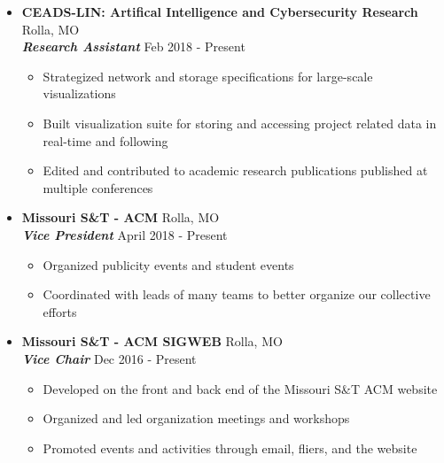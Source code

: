 \documentclass[9pt,oneside]{memoir}
\begin{document}
\begin{itemize}
    \item[] \textbf{CEADS-LIN: Artifical Intelligence and Cybersecurity Research}
		\hfill Rolla, MO\\
		\textit{\textbf{Research Assistant}}
		\hfill Feb 2018 - Present
		\begin{itemize}
		    \item[\textbullet] Strategized network and storage specifications for large-scale visualizations
		    \item[\textbullet] Built visualization suite for storing and accessing project related data in real-time and following
			\item[\textbullet] Edited and contributed to academic research publications published at multiple conferences
		\end{itemize}
		
	\item[] \textbf{Missouri S\&T - ACM}
	    \hfill Rolla, MO\\
	    \textit{\textbf{Vice President}}
	    \hfill April 2018 - Present
	    \begin{itemize}
	        \item[\textbullet] Organized publicity events and student events
	        \item[\textbullet] Coordinated with leads of many teams to better organize our collective efforts
	    \end{itemize}
		
	\item[] \textbf{Missouri S\&T - ACM SIGWEB}
		\hfill Rolla, MO\\
		\textit{\textbf{Vice Chair}}
		\hfill Dec 2016 - Present
		\begin{itemize}
			\item[\textbullet] Developed on the front and back end of the Missouri S\&T ACM website
			\item[\textbullet] Organized and led organization meetings and workshops
			\item[\textbullet] Promoted events and activities through email, fliers, and the website
		\end{itemize}
\end{itemize}


\vspace*{-10pt}
\end{document}
